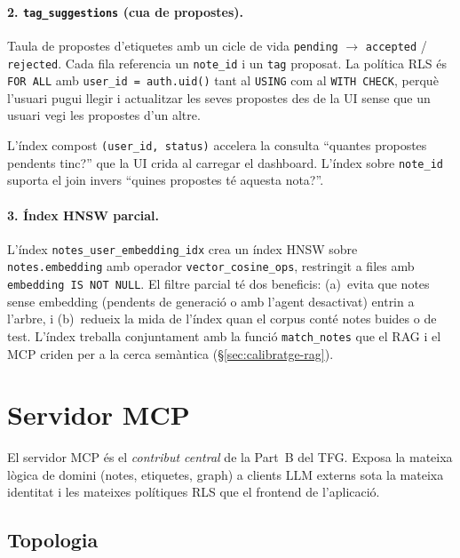 \paragraph{2. \texttt{tag\_suggestions} (cua de propostes).} Taula de propostes d'etiquetes amb un cicle de vida \texttt{pending} $\rightarrow$ \texttt{accepted} / \texttt{rejected}. Cada fila referencia un \texttt{note\_id} i un \texttt{tag} proposat. La política RLS és \texttt{FOR ALL} amb \texttt{user\_id = auth.uid()} tant al \texttt{USING} com al \texttt{WITH CHECK}, perquè l'usuari pugui llegir i actualitzar les seves propostes des de la UI sense que un usuari vegi les propostes d'un altre.

L'índex compost \texttt{(user\_id, status)} accelera la consulta ``quantes propostes pendents tinc?'' que la UI crida al carregar el dashboard. L'índex sobre \texttt{note\_id} suporta el join invers ``quines propostes té aquesta nota?''.

\paragraph{3. Índex HNSW parcial.} L'índex \texttt{notes\_user\_embedding\_idx} crea un índex HNSW sobre \texttt{notes.embedding} amb operador \texttt{vector\_cosine\_ops}, restringit a files amb \texttt{embedding IS NOT NULL}. El filtre parcial té dos beneficis: (a)~evita que notes sense embedding (pendents de generació o amb l'agent desactivat) entrin a l'arbre, i (b)~redueix la mida de l'índex quan el corpus conté notes buides o de test. L'índex treballa conjuntament amb la funció \texttt{match\_notes} que el RAG i el MCP criden per a la cerca semàntica (\S\ref{sec:calibratge-rag}).

\section{Servidor MCP}
\label{sec:servidor-mcp}

El servidor MCP és el \textit{contribut central} de la Part~B del
TFG. Exposa la mateixa lògica de domini (notes, etiquetes, graph)
a clients LLM externs sota la mateixa identitat i les mateixes
polítiques RLS que el frontend de l'aplicació.

\subsection{Topologia}

